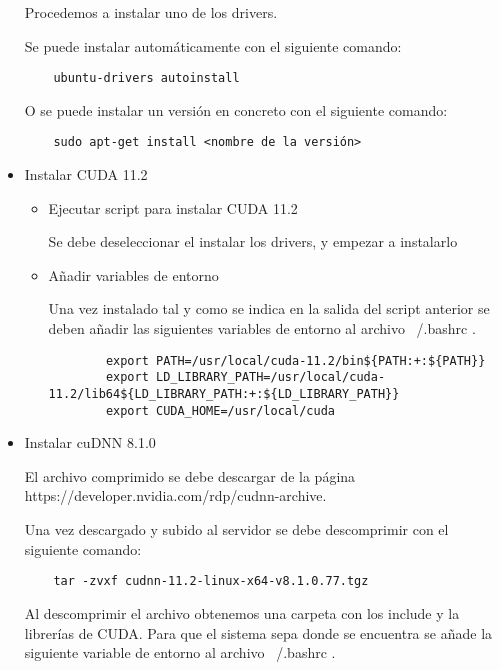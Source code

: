 \begin{itemize}
    Procedemos a instalar uno de los drivers.
    
    Se puede instalar automáticamente con el siguiente comando:
    
    \begin{lstlisting}
    ubuntu-drivers autoinstall
    \end{lstlisting}
    
    O se puede instalar un versión en concreto con el siguiente comando:
    
    \begin{lstlisting}
    sudo apt-get install <nombre de la versión>
    \end{lstlisting}
    
    \item Instalar CUDA 11.2
    
    \begin{itemize}
        \item Ejecutar script para instalar CUDA 11.2
        
        Se debe deseleccionar el instalar los drivers, y empezar a instalarlo
        
        \item Añadir variables de entorno
        
        Una vez instalado tal y como se indica en la salida del script anterior se deben añadir las siguientes variables de entorno al archivo ~/.bashrc .
        
        \begin{lstlisting}
        export PATH=/usr/local/cuda-11.2/bin${PATH:+:${PATH}}
        export LD_LIBRARY_PATH=/usr/local/cuda-11.2/lib64${LD_LIBRARY_PATH:+:${LD_LIBRARY_PATH}}
        export CUDA_HOME=/usr/local/cuda
        \end{lstlisting}
    \end{itemize}
    
    \item Instalar cuDNN 8.1.0
    
    El archivo comprimido se debe descargar de la página https://developer.nvidia.com/rdp/cudnn-archive.
    
    Una vez descargado y subido al servidor se debe descomprimir con el siguiente comando:
    
    \begin{lstlisting}
    tar -zvxf cudnn-11.2-linux-x64-v8.1.0.77.tgz
    \end{lstlisting}
    
    Al descomprimir el archivo obtenemos una carpeta con los include y la librerías de CUDA. Para que el sistema sepa donde se encuentra se añade la siguiente variable de entorno al archivo ~/.bashrc .
    

\end{itemize}
